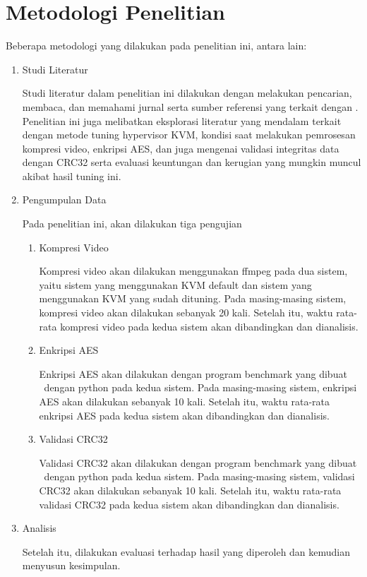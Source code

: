 \section{Metodologi Penelitian}
Beberapa metodologi yang dilakukan pada penelitian ini, antara lain:
\begin{enumerate}
  \item Studi Literatur
  
  Studi literatur dalam penelitian ini dilakukan dengan melakukan pencarian, membaca, dan memahami jurnal serta sumber referensi yang terkait dengan \cc. Penelitian ini juga melibatkan eksplorasi literatur yang mendalam terkait dengan metode tuning hypervisor KVM, kondisi saat melakukan pemrosesan kompresi video, enkripsi AES, dan juga mengenai validasi integritas data dengan CRC32 serta evaluasi keuntungan dan kerugian yang mungkin muncul akibat hasil tuning ini.
  
  \item Pengumpulan Data
  
  Pada penelitian ini, akan dilakukan tiga pengujian
  \begin{enumerate}
    \item Kompresi Video
    
    Kompresi video akan dilakukan menggunakan ffmpeg pada dua sistem, yaitu sistem yang menggunakan KVM default dan sistem yang menggunakan KVM yang sudah dituning. Pada masing-masing sistem, kompresi video akan dilakukan sebanyak 20 kali. Setelah itu, waktu rata-rata kompresi video pada kedua sistem akan dibandingkan dan dianalisis.

    \item Enkripsi AES
    
    Enkripsi AES akan dilakukan dengan program benchmark yang dibuat \saya\ dengan python pada kedua sistem. Pada masing-masing sistem, enkripsi AES akan dilakukan sebanyak 10 kali. Setelah itu, waktu rata-rata enkripsi AES pada kedua sistem akan dibandingkan dan dianalisis.

    \item Validasi CRC32
    
    Validasi CRC32 akan dilakukan dengan program benchmark yang dibuat \saya\ dengan python pada kedua sistem. Pada masing-masing sistem, validasi CRC32 akan dilakukan sebanyak 10 kali. Setelah itu, waktu rata-rata validasi CRC32 pada kedua sistem akan dibandingkan dan dianalisis.
  \end{enumerate}
  
  \item Analisis
  
  Setelah itu, dilakukan evaluasi terhadap hasil yang diperoleh dan kemudian menyusun kesimpulan.
\end{enumerate}


